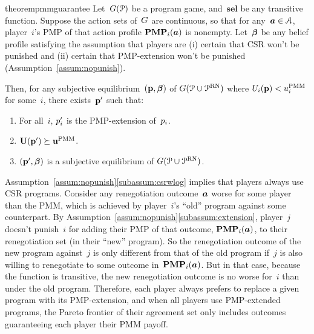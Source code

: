 \documentclass[sigconf]{aamas}
\newcommand{\allprogreneg}{\allprog^{\text{RN}}}
\newcommand{\selection}{sel}%
\newcommand{\renegb}{\mathbf{\selection}}
\theoremstyle{definition}
\begin{document}
\begin{restatable}{theorem}{pmmguarantee}
\label{prop:yudpoint}
Let~$G(\mathcal{P})$ be a program game,
and~$\renegb$ be any transitive \selfunction{} function.
Suppose
the action sets of~$G$
are continuous, so
that for any~$\boldsymbol{a} \in \mathcal{A}$,
player~$i$'s PMP of that action profile
$\mathbf{PMP}_i(\boldsymbol{a})$
is nonempty.
Let~$\boldsymbol{\beta}$ be any belief profile
satisfying the assumption 
that players are (i) certain that CSR won't be punished and (ii) certain that
PMP-extension won't be punished (Assumption~\ref{assum:nopunish}). 


 Then,
 for any subjective equilibrium~$(\textbf{p}, \boldsymbol{\beta})$ of $\game(\allprog \cup \allprogreneg)$
 where $U_i(\textbf{p}) < u_i^{\textnormal{PMM}}$ 
 for some~$i$,
 there exists~$\textbf{p}'$
 such that:
    \begin{enumerate}
        \item  For all~$i$, $p_i'$ is
     the PMP-extension of~$p_i$.
    \item $\textbf{U}(\textbf{p}') \succeq \textbf{u}^{\textnormal{PMM}}$.
    \item $(\textbf{p}', \boldsymbol{\beta})$
      is a subjective equilibrium
      of  $\game(\allprog \cup \allprogreneg)$.
    \end{enumerate}
\end{restatable}
\begin{sketch}
Assumption~\ref{assum:nopunish}\ref{subassum:csrwlog}
implies that players always use CSR programs.
Consider
any renegotiation outcome~$\boldsymbol{a}$
worse for some player than the PMM,
which is achieved
by player~$i$'s ``old'' program
against some counterpart.
By Assumption~\ref{assum:nopunish}\ref{subassum:extension}, player~$j$ doesn't
punish~$i$ for adding
their PMP
of that outcome,
$\mathbf{PMP}_i(\boldsymbol{a})$,
to their
renegotiation set
(in their ``new'' program).
So the renegotiation outcome
of the new program
against~$j$
is only different
from that of the old
program
if~$j$ is also willing
to renegotiate
to some outcome in~$\mathbf{PMP}_i(\boldsymbol{a})$.
But in that case,
because the \selfunction{} function
is transitive,
the new renegotiation outcome
is no worse for~$i$
than under the old program.
Therefore,
each player always prefers to
replace a given program
with its PMP-extension,
and when all players
use PMP-extended programs,
the Pareto frontier of
their agreement set only includes
outcomes guaranteeing
each player
their PMM payoff.
\end{sketch}
\end{document}
